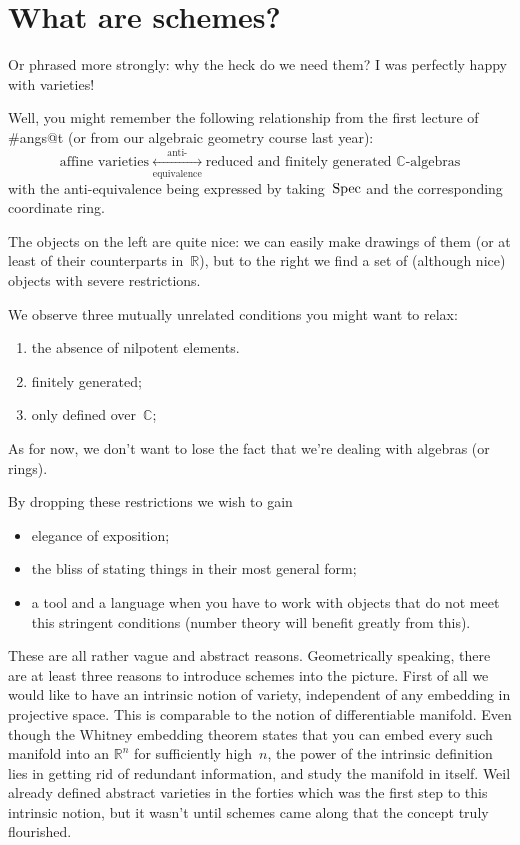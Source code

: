 \section{What are schemes?}

Or phrased more strongly: why the heck do we need them? I was perfectly happy with varieties!

Well, you might remember the following relationship from the first lecture of \#angs@t (or from our algebraic geometry course last year):
\begin{equation}
  \text{affine varieties} \underset{\text{equivalence}}{\overset{\text{anti-}}{\longleftrightarrow}} \text{reduced and finitely generated $\mathbb{C}$-algebras}
  \label{equation:variety-anti-equivalence}
\end{equation}
with the anti-equivalence being expressed by taking~$\operatorname{Spec}$ and the corresponding coordinate ring.

The objects on the left are quite nice: we can easily make drawings of them (or at least of their counterparts in~$\mathbb{R}$), but to the right we find a set of (although nice) objects with severe restrictions.

We observe three mutually unrelated conditions you might want to relax:
\begin{enumerate}
  \item the absence of nilpotent elements.
  \item finitely generated;
  \item only defined over~$\mathbb{C}$;
\end{enumerate}
As for now, we don't want to lose the fact that we're dealing with algebras (or rings).

By dropping these restrictions we wish to gain
\begin{itemize}
  \item elegance of exposition;
  \item the bliss of stating things in their most general form;
  \item a tool and a language when you have to work with objects that do not meet this stringent conditions (number theory will benefit greatly from this).
\end{itemize}

These are all rather vague and abstract reasons. Geometrically speaking, there are at least three reasons to introduce schemes into the picture. First of all we would like to have an intrinsic notion of variety, independent of any embedding in projective space. This is comparable to the notion of differentiable manifold. Even though the Whitney embedding theorem states that you can embed every such manifold into an $\mathbb{R}^{n}$ for sufficiently high~$n$, the power of the intrinsic definition lies in getting rid of redundant information, and study the manifold in itself. Weil already defined abstract varieties in the forties which was the first step to this intrinsic notion, but it wasn't until schemes came along that the concept truly flourished.

